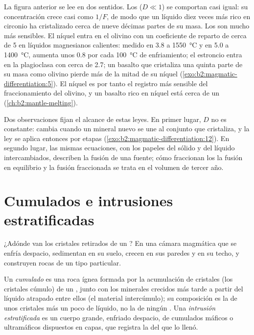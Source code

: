 La figura anterior se lee en dos sentidos. Los  ($D \ll 1$) se comportan
casi igual: su concentración crece casi como $1/F$, de modo que un líquido diez veces
más rico en circonio ha cristalizado cerca de nueve décimas partes de su masa. Los  son mucho más sensibles. El níquel entra en el olivino con un coeficiente
de reparto de cerca de 5 en líquidos magnesianos calientes: medido en 3.8 a
\qty{1550}{\celsius} y en 5.0 a \qty{1400}{\celsius}, aumenta unos 0.8 por cada
\qty{100}{\celsius} de enfriamiento; el estroncio entra en la
plagioclasa con cerca de 2.7; un basalto que cristaliza una quinta parte de su masa como
olivino pierde más de la mitad de su níquel (\cref{exo:b2:magmatic-differentiation:5}). El níquel es por tanto el
registro más sensible del fraccionamiento del olivino, y un basalto rico en níquel está
cerca de un  (\cref{ch:b2:mantle-melting}).

Dos observaciones fijan el alcance de estas leyes. En primer lugar, $D$ no es constante: cambia
cuando un mineral nuevo se une al conjunto que cristaliza, y la ley se aplica entonces
por etapas (\cref{exo:b2:magmatic-differentiation:12}). En segundo lugar, las mismas ecuaciones, con los papeles del sólido y del
líquido intercambiados, describen la fusión de una fuente; cómo fraccionan los  la fusión en
equilibrio y la fusión fraccionada se trata en el volumen de tercer año.

\section{Cumulados e intrusiones estratificadas}\label{sec:b2:magmatic-differentiation:cumulates}

¿Adónde van los cristales retirados de un ? En una cámara magmática que se enfría
despacio, sedimentan en su suelo, crecen en sus paredes y en su techo, y construyen rocas de un
tipo particular.

\begin{definition}\label{def:b2:magmatic-differentiation:cumulate}
Un \emph{cumulado} es una roca ígnea formada por la acumulación de
cristales (los cristales cúmulo) de un , junto con los minerales crecidos más tarde
a partir del líquido atrapado entre ellos (el material intercúmulo); su composición
es la de unos cristales más un poco de líquido, no la de ningún . Una \emph{intrusión
estratificada} es un cuerpo grande, enfriado despacio, de cumulados máficos o
ultramáficos dispuestos en capas, que registra la  del
 que lo llenó.
\end{definition}

